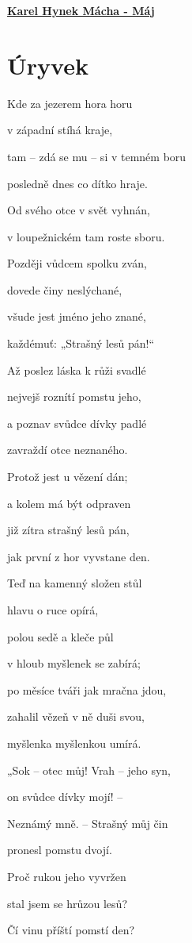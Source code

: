 \documentclass[11pt]{article}
\begin{document}
    \begin{center}
        \underline{\textbf{\Huge Karel Hynek Mácha - Máj}}
    \end{center}
    \section*{Úryvek}
    Kde za jezerem hora horu

    v západní stíhá kraje,

tam – zdá se mu – si v temném boru

posledně dnes co dítko hraje.

Od svého otce v svět vyhnán,

v loupežnickém tam roste sboru.

Později vůdcem spolku zván,

dovede činy neslýchané,

všude jest jméno jeho znané,

každémuť: „Strašný lesů pán!“

Až poslez láska k růži svadlé

nejvejš roznítí pomstu jeho,

a poznav svůdce dívky padlé

zavraždí otce neznaného.

Protož jest u vězení dán;

a kolem má být odpraven

již zítra strašný lesů pán,

jak první z hor vyvstane den.

\bigskip

Teď na kamenný složen stůl

hlavu o ruce opírá,

polou sedě a kleče půl

v hloub myšlenek se zabírá;

po měsíce tváři jak mračna jdou,

zahalil vězeň v ně duši svou,

myšlenka myšlenkou umírá.

\bigskip

„Sok – otec můj! Vrah – jeho syn,

on svůdce dívky mojí! –

Neznámý mně. – Strašný můj čin

pronesl pomstu dvojí.

Proč rukou jeho vyvržen

stal jsem se hrůzou lesů?

Čí vinu příští pomstí den?
\end{document}

